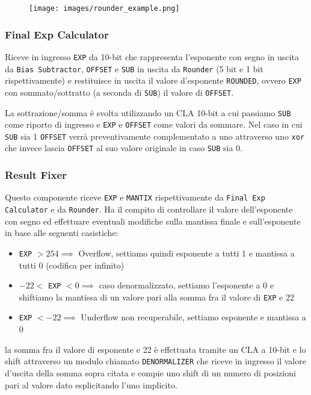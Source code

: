 \documentclass[twoside,11pt]{article}
\begin{document}
{\begin{figure}[h!]
    \centering
    \texttt{[image: images/rounder\_example.png]}
\end{figure}

\subsubsection{Final Exp Calculator}
Riceve in ingresso \verb|EXP| da 10-bit che rappresenta l’esponente con segno in uscita da \verb|Bias Subtractor|, \verb|OFFSET| e \verb|SUB| in uscita da \verb|Rounder| (5 bit e 1 bit rispettivamente) e restituisce in uscita il valore d’esponente \verb|ROUNDED|, ovvero \verb|EXP| con sommato/sottratto (a seconda di \verb|SUB|) il valore di \verb|OFFSET|.

La sottrazione/somma è svolta utilizzando un CLA 10-bit a cui passiamo \verb|SUB| come riporto di ingresso e \verb|EXP| e \verb|OFFSET| come valori da sommare. Nel caso in cui \verb|SUB| sia 1 \verb|OFFSET| verrà preventivamente complementato a uno attraverso uno \verb|xor| che invece lascia \verb|OFFSET| al suo valore originale in caso \verb|SUB| sia 0.

\subsubsection{Result Fixer}
Questo componente riceve \verb|EXP| e \verb|MANTIX| rispettivamente da \verb|Final Exp Calculator| e da \verb|Rounder|. Ha il compito di controllare il valore dell'esponente con segno ed effettuare eventuali modifiche sulla mantissa finale e sull'esponente in base alle seguenti casistiche:
\begin{itemize}[noitemsep]
    \item \verb|EXP| $> 254 \implies$ Overflow, settiamo quindi esponente a tutti 1 e mantissa a tutti 0 (codifica per infinito)
    \item $-22 <$ \verb|EXP| $< 0 \implies$ caso denormalizzato, settiamo l’esponente a 0 e shiftiamo la mantissa di un valore pari alla somma fra il valore di \verb|EXP| e 22
    \item \verb|EXP| $< -22 \implies$ Underflow non recuperabile, settiamo esponente e mantissa a 0
\end{itemize}
la somma fra il valore di esponente e 22 è effettuata tramite un CLA a 10-bit e lo shift attraverso un modulo chiamato \verb|DENORMALIZER| che riceve in ingresso il valore d’uscita della somma sopra citata e compie uno shift di un numero di posizioni pari al valore dato esplicitando l’uno implicito.

}
\end{document}
